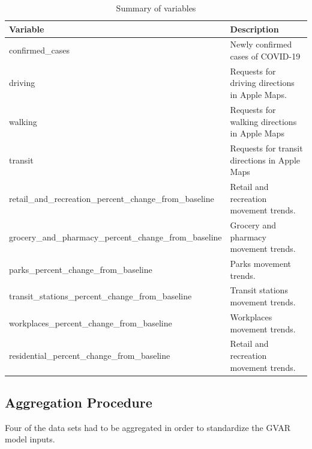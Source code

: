 \documentclass[preprint, 12pt]{elsarticle}
\newcommand{\?}{\stackrel{?}{=}}
\begin{document}
\begin{table}[h!]
  \centering
\caption{Summary of variables}
\label{tab:variables}
\small
\begin{tabular}{ll}\toprule
\textbf{Variable}                                         & \textbf{Description}                                    \\\midrule
confirmed\_cases                                         & Newly confirmed cases of COVID-19              \\
driving                                                  & Requests for driving directions in Apple Maps.    \\
walking                                                  & Requests for walking directions in Apple Maps   \\
transit                                                  & Requests for transit directions in Apple Maps   \\
retail\_and\_recreation\_percent\_change\_from\_baseline & Retail and recreation movement trends.            \\
grocery\_and\_pharmacy\_percent\_change\_from\_baseline  & Grocery and pharmacy movement trends.             \\
parks\_percent\_change\_from\_baseline                   & Parks movement trends.                           \\
transit\_stations\_percent\_change\_from\_baseline       & Transit stations movement trends.                \\
workplaces\_percent\_change\_from\_baseline              & Workplaces movement trends.                      \\
residential\_percent\_change\_from\_baseline             & Retail and recreation movement trends.          \\\bottomrule
\end{tabular}
\end{table}

\subsection{Aggregation Procedure}
Four of the data sets had to be aggregated in order to standardize the GVAR model inputs. 
 
\end{document}
